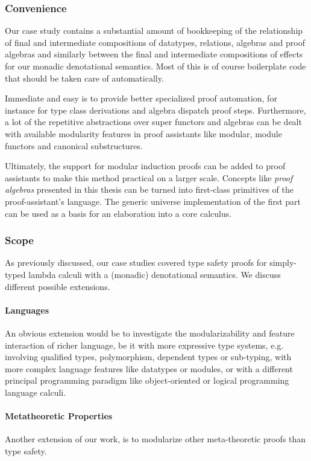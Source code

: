 \subsubsection{Convenience}

Our case study contains a substantial amount of bookkeeping of the relationship
of final and intermediate compositions of datatypes, relations, algebras and
proof algebras and similarly between the final and intermediate compositions of
effects for our monadic denotational semantics. Most of this is of course
boilerplate code that should be taken care of automatically.

Immediate and easy is to provide better specialized proof automation, for
instance for type class derivations and algebra dispatch proof steps.
Furthermore, a lot of the repetitive abstractions over super functors and
algebras can be dealt with available modularity features in proof assistants
like modular, module functors and canonical substructures.

Ultimately, the support for modular induction proofs can be added to proof
assistants to make this method practical on a larger scale. Concepts like
\emph{proof algebras} presented in this thesis can be turned into first-class
primitives of the proof-assistant's language. The generic universe
implementation of the first part can be used as a basis for an elaboration into
a core calculus.


\subsubsection{Scope}

As previously discussed, our case studies covered type safety proofs for
simply-typed lambda calculi with a (monadic) denotational semantics. We discuss
different possible extensions.

\paragraph{Languages}
An obvious extension would be to investigate the modularizability and feature
interaction of richer language, be it with more expressive type systems, e.g.
involving qualified types, polymorphism, dependent types or sub-typing, with
more complex language features like datatypes or modules, or with a different
principal programming paradigm like object-oriented or logical programming
language calculi.

\paragraph{Metatheoretic Properties}
Another extension of our work, is to modularize other meta-theoretic proofs than
type safety.

